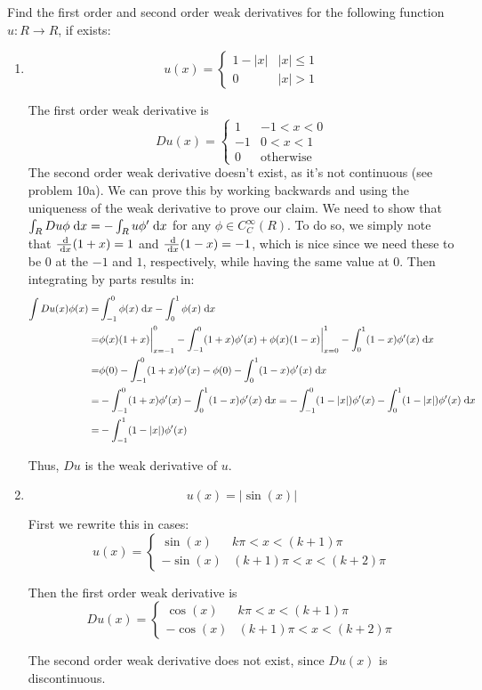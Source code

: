 Find the first order and second order weak derivatives for the following function $u: R \rightarrow R$, if exists:

\begin{enumerate}
\item
  $$
  u(x) =
  \begin{cases}
    1 - |x| & |x| \leq 1\\
    0 & |x| > 1
  \end{cases}
  $$

  The first order weak derivative is
  $$
  Du(x) =
  \begin{cases}
    1 & -1 < x < 0\\
    -1 & 0 < x < 1\\
    0 & \text{otherwise}
  \end{cases}
  $$
  The second order weak derivative doesn't exist, as it's not continuous (see problem 10a).
  We can prove this by working backwards and using the uniqueness of the weak derivative to prove our claim.
  We need to show that $\int_R Du \phi \;\mathrm{d}x = -\int_R u \phi' \;\mathrm{d}x$ for any $\phi \in C_C^\infty(R)$.
  To do so, we simply note that $\frac{\;\mathrm{d}}{\;\mathrm{d}x}(1 + x) = 1$ and $\frac{\;\mathrm{d}}{\;\mathrm{d}x}(1 - x) = -1$,
  which is nice since we need these to be $0$ at the $-1$ and $1$, respectively, while having the same value at $0$.
  Then integrating by parts results in:
  \begin{align*}
    \int Du(x) \phi(x) = &\int_{-1}^0 \phi(x) \;\mathrm{d}x - \int_0^1 \phi(x) \;\mathrm{d}x\\
                       = &\phi(x) (1 + x) \bigg\rvert_{x=-1}^{0} - \int_{-1}^0 (1 + x) \phi'(x)
                          + \phi(x) (1 - x) \bigg\rvert_{x=0}^{1} - \int_0^1 (1 - x) \phi'(x) \;\mathrm{d}x\\
                       = &\phi(0) - \int_{-1}^0 (1 + x) \phi'(x) - \phi(0) - \int_0^1 (1 - x) \phi'(x) \;\mathrm{d}x\\
                       = &-\int_{-1}^0 (1 + x) \phi'(x) - \int_0^1 (1 - x) \phi'(x) \;\mathrm{d}x
                       = -\int_{-1}^0 (1 - |x|) \phi'(x) - \int_0^1 (1 - |x|) \phi'(x) \;\mathrm{d}x\\
                       = &-\int_{-1}^1 (1 - |x|) \phi'(x)
  \end{align*}

  Thus, $Du$ is the weak derivative of $u$.

\item
  $$
  u(x) = |\sin(x)|
  $$

  First we rewrite this in cases:
  $$
  u(x) =
  \begin{cases}
    \sin(x) & k \pi < x < (k + 1) \pi\\
    -\sin(x) & (k + 1) \pi < x < (k + 2) \pi
  \end{cases}
  $$

  Then the first order weak derivative is
  $$
  Du(x) =
  \begin{cases}
    \cos(x) & k \pi < x < (k + 1) \pi\\
    -\cos(x) & (k + 1) \pi < x < (k + 2) \pi
  \end{cases}
  $$

  The second order weak derivative does not exist, since $Du(x)$ is discontinuous.
\end{enumerate}
